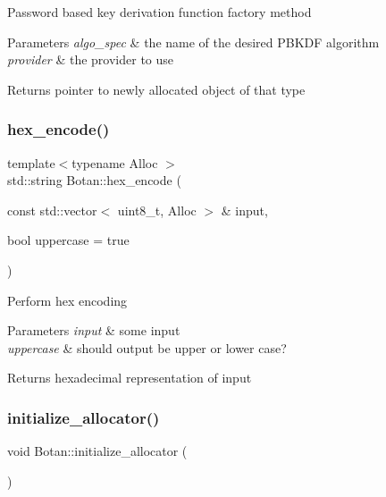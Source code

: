 Password based key derivation function factory method 
\begin{DoxyParams}{Parameters}
{\em algo\+\_\+spec} & the name of the desired P\+B\+K\+DF algorithm \\
\hline
{\em provider} & the provider to use \\
\hline
\end{DoxyParams}
\begin{DoxyReturn}{Returns}
pointer to newly allocated object of that type 
\end{DoxyReturn}
\mbox{\label{namespace_botan_a02a63d270351924b382780ee6d5b80c3}} 
\subsubsection{\texorpdfstring{hex\+\_\+encode()}{hex\_encode()}}
{\footnotesize\ttfamily template$<$typename Alloc $>$ \\
std\+::string Botan\+::hex\+\_\+encode (\begin{DoxyParamCaption}\item[{const std\+::vector$<$ uint8\+\_\+t, Alloc $>$ \&}]{input,  }\item[{bool}]{uppercase = {\ttfamily true} }\end{DoxyParamCaption})}

Perform hex encoding 
\begin{DoxyParams}{Parameters}
{\em input} & some input \\
\hline
{\em uppercase} & should output be upper or lower case? \\
\hline
\end{DoxyParams}
\begin{DoxyReturn}{Returns}
hexadecimal representation of input 
\end{DoxyReturn}
\mbox{\label{namespace_botan_a5c191055a4f5a2dba6bfde0e8056eaab}} 
\subsubsection{\texorpdfstring{initialize\+\_\+allocator()}{initialize\_allocator()}}
{\footnotesize\ttfamily void Botan\+::initialize\+\_\+allocator (\begin{DoxyParamCaption}{ }\end{DoxyParamCaption})}

